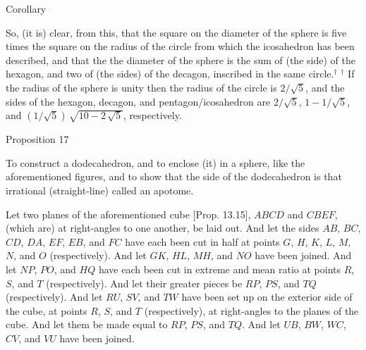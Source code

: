 \begin{center}
{\large Corollary}
\end{center}

So,  (it is) clear, from this, that the square on the diameter of the sphere
is five times the square on the radius of the circle from which the icosahedron has been described,
and that the the diameter of the sphere is the sum of (the side) of the hexagon, 
and two of (the sides) of the decagon, inscribed in the same circle.$^\dag$ 
{\footnotesize\noindent$^\dag$ If the radius of the sphere is unity then the
radius of the circle is $2/\sqrt{5}$, and the sides of the hexagon, decagon,
and pentagon/icosahedron are $2/\sqrt{5}$, $1-1/\sqrt{5}$, and $(1/\sqrt{5})\,\sqrt{10-2\,\sqrt{5}}$, respectively.}


\begin{center}
{\large Proposition 17}
\end{center}

To construct a dodecahedron, and to enclose (it) in a sphere, like the
aforementioned figures, and to show that the side of the dodecahedron 
is that irrational (straight-line) called an apotome.

\epsfysize=3in
\centerline{}

Let two planes of the aforementioned cube [Prop. 13.15], $ABCD$ and $CBEF$,  (which are) at right-angles to one another,
be laid out. And let the sides $AB$, $BC$, $CD$, $DA$, $EF$,
$EB$, and $FC$  have each been cut in half at points $G$, $H$, $K$, $L$,
$M$, $N$, and $O$ (respectively). And let $GK$, $HL$, $MH$, and
$NO$ have been joined. And let $NP$, $PO$, and $HQ$ have each been
cut in extreme and mean ratio at points $R$, $S$, and $T$ (respectively).
And let their greater pieces be $RP$, $PS$, and $TQ$ (respectively).
And let $RU$, $SV$, and $TW$ have been set up on the exterior side of the cube,  at points
$R$, $S$, and $T$ (respectively), at right-angles to the planes of the cube.
 And let them be made equal to $RP$,
$PS$, and $TQ$. And let
$UB$, $BW$, $WC$, $CV$, and $VU$ have been joined.

